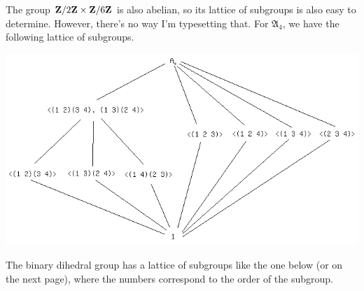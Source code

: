 \documentclass[11pt, twoside]{amsart}
\begin{document}
The group $\mathbf{Z}/2\mathbf{Z}\times\mathbf{Z}/6\mathbf{Z} $ is also abelian, so its lattice of subgroups is also easy to determine. However, there's no way I'm typesetting that. For $\mathfrak{A}_4$, we have the following lattice of subgroups. 
\begin{center}
\includegraphics [scale = 0.5] {images/a_4} %
\end{center}

The binary dihedral group has a lattice of subgroups like the one below (or on the next page), where the numbers correspond to the order of the subgroup.
\begin{center}
\end{center}
\end{document}
